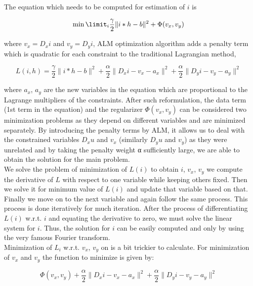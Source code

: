 \documentclass{article}
\begin{document}
The equation which needs to be computed for estimation of $i$ is

\begin{equation}
    \min\limit_{i}{\frac{\gamma}{2} \|i * h - b\|^2 + \Phi(v_x, v_y)}
\end{equation}

where $v_x = D_xi$ and $v_y = D_yi$, ALM optimization algorithm adds a penalty term which is quadratic for each constraint to the traditional Lagrangian method, 

\begin{equation}
    L(i, h) = \frac{\gamma}{2} \|i* h - b\|^2 + \frac{\alpha}{2} \|D_xi - v_x - a_x\|^2 + \frac{\alpha}{2} \|D_yi - v_y - a_y\|^2
\end{equation}

where $a_x$, $a_y$ are the new variables in the equation which are proportional to the Lagrange multipliers of the constraints. After such reformulation, the data term (1st term in the equation)  and the regularizer $\Phi(v_x, v_y)$ can be considered two minimization problems as they depend on different variables and are minimized separately. By introducing the penalty terms by ALM, it allows us to deal with the constrained variables $D_xu$ and $v_x$ (similarly $D_yu$ and $v_y$) as they were unrelated and by taking the penalty weight α sufficiently large, we are able to obtain the solution for the main problem. \\

We solve the problem of minimization of $L(i)$ to obtain $i$, $v_x$, $v_y$ we compute the derivative of $L$ with respect to one variable while keeping others fixed. Then we solve it for minimum value of $L(i)$ and update that variable based on that. Finally we move on to the next variable and again follow the same process. This process is done iteratively for much iteration. After the process of differentiating $L(i)$ w.r.t. $i$ and equating the derivative to zero, we must solve the linear system  for $i$. Thus, the solution for $i$ can be easily computed and only by using the very famous Fourier transform. \\

Minimization of $L_i$ w.r.t. $v_x$, $v_y$ on is a bit trickier to calculate. For minimization of $v_x$ and $v_y$ the function to minimize is given by: 

\begin{equation}
    \Phi(v_x, v_y) + \frac{\alpha}{2} \|D_xi - v_x - a_x\|^2 + \frac{\alpha}{2} \|D_yi - v_y - a_y\|^2
\end{equation}
\end{document}
